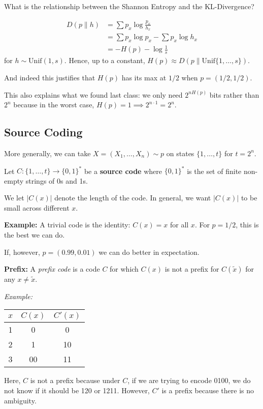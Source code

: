 \documentclass[12pt]{report}
\newcommand{\abs}[1]{\left\vert #1 \right\vert}
\newcommand*{\tbf}[1]{\ifmmode\mathbf{#1}\else\textbf{#1}\fi}
\begin{document}
What is the relationship between the Shannon Entropy and the KL-Divergence?

\begin{align*}
	D(p \parallel h) & = \sum p_x \log \frac{p_x}{h_x}         \\
	                 & = \sum p_x \log p_x - \sum p_x \log h_x \\
	                 & = -H(p) - \log \frac{1}{s}
\end{align*}
for $h \sim \text{Unif}(1, s)$. Hence, up to a constant, $H(p) \approx D(p \parallel \text{Unif}\{1, \dots, s\})$.

And indeed this justifies that $H(p)$ has its max at $1/2$ when $p = (1/2, 1/2)$.

This also explains what we found last class: we only need $2^{nH(p)}$ bits rather than $2^n$ because in the worst case, $H(p) = 1 \implies 2^{n\cdot 1} = 2^n$.

\subsection{Source Coding}
More generally, we can take $X = (X_1, \dots, X_n) \sim p$ on states $\{1, \dots, t\}$ for $t = 2^n$.

Let $C: \{1, \dots, t\} \to \{0, 1\}^*$ be a \tbf{source code} where $\{0, 1\}^*$ is the set of finite non-empty strings of 0s and 1s.

We let $\abs{C(x)}$ denote the length of the code. In general, we want $\abs{C(x)}$ to be small across different $x$.

\tbf{Example:} A trivial code is the identity: $C(x) = x$ for all $x$. For $p = 1/2$, this is the best we can do.

If, however, $p = (0.99, 0.01)$ we can do better in expectation.

\tbf{Prefix:} A \emph{prefix code} is a code $C$ for which $C(x)$ is not a prefix for $C(\tilde x)$ for any $x \neq \tilde x$.

\emph{Example:}

\qquad \begin{tabular}{c|cc}
	$x$ & $C(x)$ & $C'(x)$ \\ \hline
	1   & 0      & 0       \\
	2   & 1      & 10      \\
	3   & 00     & 11      \\ \hline
\end{tabular}

Here, $C$ is not a prefix because under $C$, if we are trying to encode 0100, we do not know if it should be 120 or 1211. However, $C'$ is a prefix because there is no ambiguity.
\end{document}
